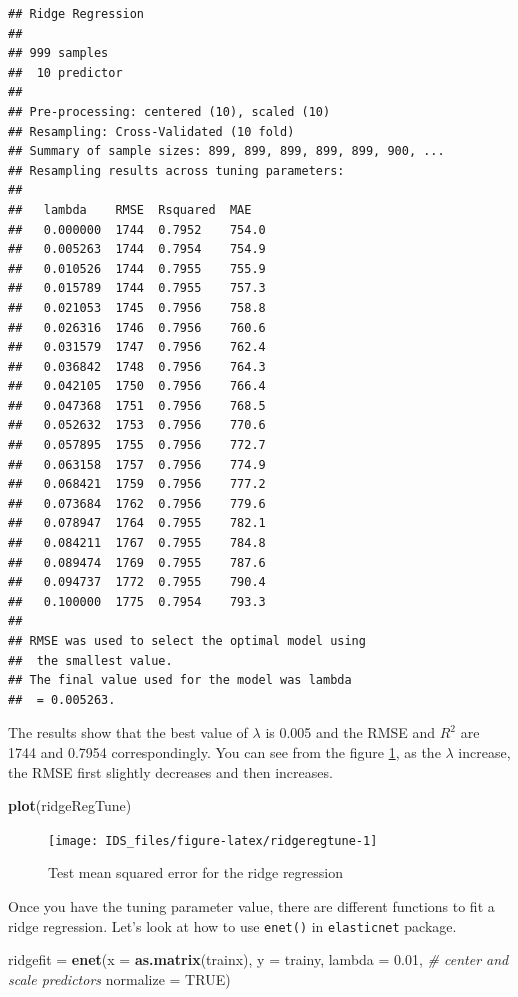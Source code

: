 \documentclass[12pt,]{krantz}
\makeatletter
\newenvironment{Shaded}{\begin{snugshade}}{\end{snugshade}}
\newcommand{\CommentTok}[1]{\textcolor[rgb]{0.37,0.37,0.37}{\textit{#1}}}
\newcommand{\DataTypeTok}[1]{\textcolor[rgb]{0.27,0.27,0.27}{#1}}
\newcommand{\FloatTok}[1]{\textcolor[rgb]{0.06,0.06,0.06}{#1}}
\newcommand{\KeywordTok}[1]{\textcolor[rgb]{0.27,0.27,0.27}{\textbf{#1}}}
\newcommand{\NormalTok}[1]{#1}
\newcommand{\OtherTok}[1]{\textcolor[rgb]{0.37,0.37,0.37}{#1}}
\newcommand{\StringTok}[1]{\textcolor[rgb]{0.5,0.5,0.5}{#1}}
\newenvironment{kframe}{%
\medskip{}
\setlength{\fboxsep}{.8em}
 \def\at@end@of@kframe{}%
 \ifinner\ifhmode%
  \def\at@end@of@kframe{\end{minipage}}%
  \begin{minipage}{\columnwidth}%
 \fi\fi%
 \def\FrameCommand##1{\hskip\@totalleftmargin \hskip-\fboxsep
 \colorbox{shadecolor}{##1}\hskip-\fboxsep
     \hskip-\linewidth \hskip-\@totalleftmargin \hskip\columnwidth}%
 \MakeFramed {\advance\hsize-\width
   \@totalleftmargin\z@ \linewidth\hsize
   \@setminipage}}%
 {\par\unskip\endMakeFramed%
 \at@end@of@kframe}
\renewenvironment{Shaded}{\begin{kframe}}{\end{kframe}}
\makeatother
\begin{document}
\begin{verbatim}
## Ridge Regression 
## 
## 999 samples
##  10 predictor
## 
## Pre-processing: centered (10), scaled (10) 
## Resampling: Cross-Validated (10 fold) 
## Summary of sample sizes: 899, 899, 899, 899, 899, 900, ... 
## Resampling results across tuning parameters:
## 
##   lambda    RMSE  Rsquared  MAE  
##   0.000000  1744  0.7952    754.0
##   0.005263  1744  0.7954    754.9
##   0.010526  1744  0.7955    755.9
##   0.015789  1744  0.7955    757.3
##   0.021053  1745  0.7956    758.8
##   0.026316  1746  0.7956    760.6
##   0.031579  1747  0.7956    762.4
##   0.036842  1748  0.7956    764.3
##   0.042105  1750  0.7956    766.4
##   0.047368  1751  0.7956    768.5
##   0.052632  1753  0.7956    770.6
##   0.057895  1755  0.7956    772.7
##   0.063158  1757  0.7956    774.9
##   0.068421  1759  0.7956    777.2
##   0.073684  1762  0.7956    779.6
##   0.078947  1764  0.7955    782.1
##   0.084211  1767  0.7955    784.8
##   0.089474  1769  0.7955    787.6
##   0.094737  1772  0.7955    790.4
##   0.100000  1775  0.7954    793.3
## 
## RMSE was used to select the optimal model using
##  the smallest value.
## The final value used for the model was lambda
##  = 0.005263.
\end{verbatim}

The results show that the best value of \(\lambda\) is 0.005 and the RMSE and \(R^{2}\) are 1744 and 0.7954 correspondingly. You can see from the figure \ref{fig:ridgeregtune}, as the \(\lambda\) increase, the RMSE first slightly decreases and then increases.

\begin{Shaded}
\begin{Highlighting}[]
\KeywordTok{plot}\NormalTok{(ridgeRegTune)}
\end{Highlighting}
\end{Shaded}

\begin{figure}

{\centering \texttt{[image: IDS\_files/figure-latex/ridgeregtune-1]} 

}

\caption{Test mean squared error for the ridge regression}\label{fig:ridgeregtune}
\end{figure}

Once you have the tuning parameter value, there are different functions to fit a ridge regression. Let's look at how to use \texttt{enet()} in \texttt{elasticnet} package.

\begin{Shaded}
\begin{Highlighting}[]
\NormalTok{ridgefit =}\StringTok{ }\KeywordTok{enet}\NormalTok{(}\DataTypeTok{x =} \KeywordTok{as.matrix}\NormalTok{(trainx), }\DataTypeTok{y =}\NormalTok{ trainy, }\DataTypeTok{lambda =} \FloatTok{0.01}\NormalTok{,}
                \CommentTok{# center and scale predictors}
                \DataTypeTok{normalize =} \OtherTok{TRUE}\NormalTok{)}
\end{Highlighting}
\end{Shaded}
\end{document}
